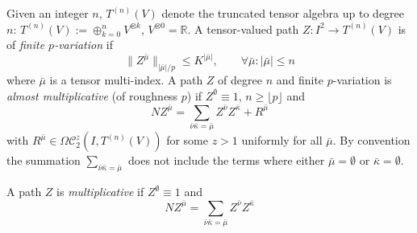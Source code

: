 \documentclass[a4paper,12pt,reqno]{amsproc}
\newcommand{\RR}{\mathbb{R}}
\newcommand{\NN}{N}
\newcommand{\OCC}{\Omega \mathcal{C}}
\begin{document}
Given an integer $n$, $T^{(n)}(V)$ denote the truncated tensor algebra
up to degree $n$:   $T^{(n)}(V) := \oplus_{k=0}^n V^{\otimes k}$,
$V^{\otimes 0 } = \RR$. A tensor-valued path $Z : I^2
\to T^{(n)}(V)$ is of \emph{finite $p$-variation} if 
\begin{equation}
  \label{eq:finite_p_variation_path}
 \|Z^{\bar{\mu}}\|_{|\bar{\mu}|/p} \le K^{|\bar\mu|}, \qquad \forall
 \bar{\mu} : | \bar{\mu}| \le n  
\end{equation}
where $\bar{\mu}$ is a tensor multi-index. A path $Z$ of degree $n$
and finite $p$-variation is \emph{almost multiplicative} (of roughness $p$) if
$Z^\emptyset \equiv 1$, $n \ge \lfloor p \rfloor$ and
\begin{equation}
  \label{eq:almost_multiplicative}
  \NN Z^{\bar\mu} =  
\sum_{\bar\nu\bar\kappa =  \bar\mu}
  Z^{\bar\nu} Z^{\bar\kappa} + R^{\bar\mu}
\end{equation}
with $R^{\bar\mu} \in \OCC_2^z(I,T^{(n)}(V))$ for some $z>1$ uniformly
for all $\bar\mu$. By convention  the summation
$\sum_{\bar\nu\bar\kappa =  \bar\mu}$ does not include the terms where
either $\bar\mu =\emptyset$ or $\bar\kappa = \emptyset$. 

A path $Z$ is \emph{multiplicative} if
$Z^\emptyset \equiv 1$ and
\begin{equation}
  \label{eq:multiplicative}
  \NN Z^{\bar\mu} =  
\sum_{\bar\nu\bar\kappa =  \bar\mu}  Z^{\bar\nu} Z^{\bar\kappa} 
\end{equation}
\end{document}
